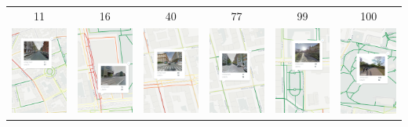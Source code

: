 \documentclass[border={5pt 1pt 5pt 5pt}, varwidth=38em]{standalone}
\begin{document}

\setlength{\tabcolsep}{0.1em}
{
\renewcommand{\arraystretch}{0.5}

\begin{table}[ht]
\centering
\begin{tabular}{cccccc}
{\tiny 11} & {\tiny 16} & {\tiny 40} & {\tiny 77} & {\tiny 99} & {\tiny 100} \\
\includegraphics[width=20mm]{cuts400/osm_w64d2_11.png} & \includegraphics[width=20mm]{cuts400/osm_w64d2_16.png} & \includegraphics[width=20mm]{cuts400/osm_w64d2_40.png} & \includegraphics[width=20mm]{cuts400/osm_w64d2_77.png} & \includegraphics[width=20mm]{cuts400/osm_w64d2_99.png} & \includegraphics[width=20mm]{cuts400/osm_w64d2_100.png}\\
\end{tabular}
\end{table}

}
\end{document}
